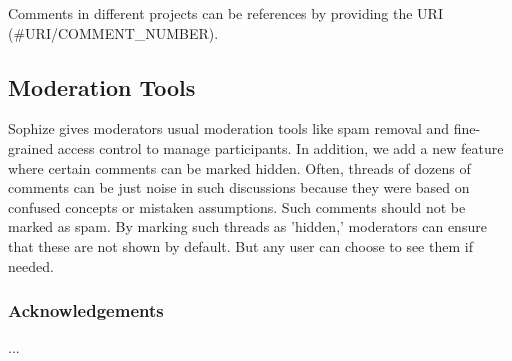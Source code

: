 \documentclass[a4paper]{article}
\begin{document}
Comments in different projects can be references by providing the URI (\#URI/COMMENT\_NUMBER).



\subsection{Moderation Tools}

Sophize gives moderators usual moderation tools like spam removal and fine-grained access control to manage participants. In addition, we add a new feature where certain comments can be marked hidden. Often, threads of dozens of comments can be just noise in such discussions because they were based on confused concepts or mistaken assumptions. Such comments should not be marked as spam. By marking such threads as 'hidden,' moderators can ensure that these are not shown by default. But any user can choose to see them if needed.



\subsubsection*{Acknowledgements}

...


 








\end{document}
